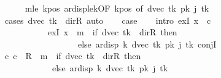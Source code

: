 \begin{isabellebody}
\ \ \ \ \isamarkupfalse%
\ m{\isacharunderscore}{\kern0pt}le\ kpos\ ar{\isacharunderscore}{\kern0pt}disp{\isacharunderscore}{\kern0pt}le{\isacharunderscore}{\kern0pt}{}k{\isacharbrackleft}{\kern0pt}OF\ kpos{\isacharcomma}{\kern0pt}\ of\ {\isachardoublequoteopen}dvec\ {\isacharquery}{\kern0pt}tk{\isachardoublequoteclose}\ {\isachardoublequoteopen}{\isacharquery}{\kern0pt}pk\ j\ {\isacharquery}{\kern0pt}tk{\isachardoublequoteclose}{\isacharbrackright}{\kern0pt}\isanewline
\ \ \ \ \isamarkupfalse%
\ {\isacharparenleft}{\kern0pt}cases\ {\isachardoublequoteopen}dvec\ {\isacharquery}{\kern0pt}tk\ {\isacharequal}{\kern0pt}\ dir{\isachardot}{\kern0pt}R{\isachardoublequoteclose}{\isacharparenright}{\kern0pt}\ auto\isanewline
\ \ \isamarkupfalse%
\ {\isacharquery}{\kern0pt}case\isanewline
\ \ \isamarkupfalse%
\ {\isacharparenleft}{\kern0pt}intro\ exI{\isacharbrackleft}{\kern0pt}\ x\ {\isacharequal}{\kern0pt}\ c{\isacharprime}{\kern0pt}{\isacharbrackright}{\kern0pt}\isanewline
\ \ \ \ \ \ \ \ \ \ \ exI{\isacharbrackleft}{\kern0pt}\ x\ {\isacharequal}{\kern0pt}\ {\isachardoublequoteopen}m\ {\isacharplus}{\kern0pt}\ {\isacharparenleft}{\kern0pt}if\ dvec\ {\isacharquery}{\kern0pt}tk\ {\isacharequal}{\kern0pt}\ dir{\isachardot}{\kern0pt}R\ then\ {}\isanewline
\ \ \ \ \ \ \ \ \ \ \ \ \ \ \ \ \ \ else\ ar{\isacharunderscore}{\kern0pt}disp\ {\isacharquery}{\kern0pt}k\ {\isacharparenleft}{\kern0pt}dvec\ {\isacharquery}{\kern0pt}tk{\isacharparenright}{\kern0pt}\ {\isacharparenleft}{\kern0pt}{\isacharquery}{\kern0pt}pk\ j\ {\isacharquery}{\kern0pt}tk{\isacharparenright}{\kern0pt}{\isacharparenright}{\kern0pt}{\isachardoublequoteclose}{\isacharbrackright}{\kern0pt}\ conjI{\isacharparenright}{\kern0pt}\isanewline
\ \ \ \ \isamarkupfalse%
\ {\isachardoublequoteopen}{\isacharparenleft}{\kern0pt}c{}{\isacharcomma}{\kern0pt}\ c{\isacharprime}{\kern0pt}{\isacharparenright}{\kern0pt}\ {\isasymin}\ {\isacharquery}{\kern0pt}R\ {\isacharcircum}{\kern0pt}{\isacharcircum}{\kern0pt}\ {\isacharparenleft}{\kern0pt}m\ {\isacharplus}{\kern0pt}\ {\isacharparenleft}{\kern0pt}if\ dvec\ {\isacharquery}{\kern0pt}tk\ {\isacharequal}{\kern0pt}\ dir{\isachardot}{\kern0pt}R\ then\ {}\isanewline
\ \ \ \ \ \ \ \ \ \ \ \ else\ ar{\isacharunderscore}{\kern0pt}disp\ {\isacharquery}{\kern0pt}k\ {\isacharparenleft}{\kern0pt}dvec\ {\isacharquery}{\kern0pt}tk{\isacharparenright}{\kern0pt}\ {\isacharparenleft}{\kern0pt}{\isacharquery}{\kern0pt}pk\ j\ {\isacharquery}{\kern0pt}tk{\isacharparenright}{\kern0pt}{\isacharparenright}{\kern0pt}{\isacharparenright}{\kern0pt}{\isachardoublequoteclose}\ \isamarkupfalse%

\end{isabellebody}
